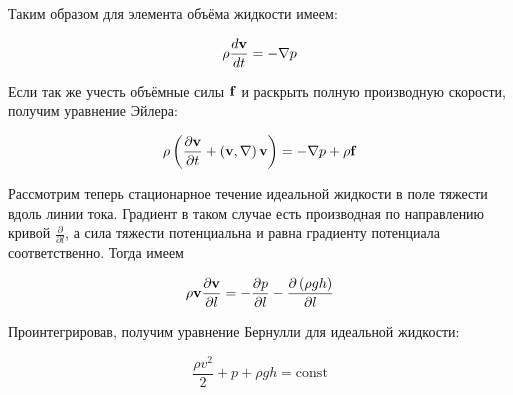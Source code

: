 \noindent
Таким образом для элемента объёма жидкости имеем:

\begin{equation*}
    \rho \frac{d \mathbf v}{dt} = - \nabla p
\end{equation*}

\noindent
Если так же учесть объёмные силы $\mathbf f$ и раскрыть полную производную скорости, получим уравнение Эйлера:

\begin{equation}
    \rho \left( \frac{\partial \mathbf v}{\partial t} + \left( \mathbf v, \nabla \right) \mathbf v \right) = - \nabla p + \rho \mathbf f
\end{equation}

Рассмотрим теперь стационарное течение идеальной жидкости в поле тяжести вдоль линии тока. Градиент в таком случае есть производная по направлению кривой $\frac{\partial}{\partial l}$, а сила тяжести потенциальна и равна градиенту потенциала соответственно. Тогда имеем

\begin{equation*}
    \rho \mathbf v \frac{\partial \mathbf v}{\partial l} = - \frac{\partial p}{\partial l} - \frac{\partial\left( \rho g h \right)}{\partial l}
\end{equation*}

\noindent
Проинтегрировав, получим уравнение Бернулли для идеальной жидкости:

\begin{equation}
    \frac{\rho v^2}{2} + p + \rho g h = \text{const}
\end{equation}